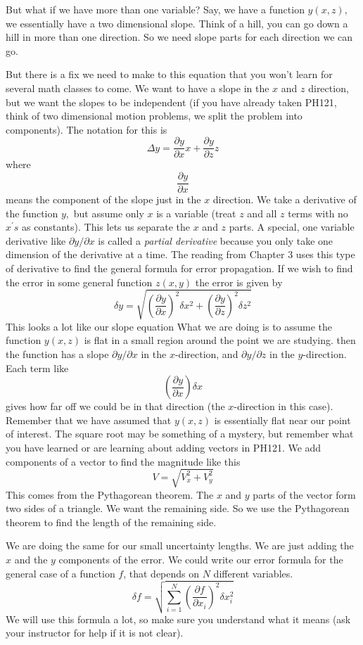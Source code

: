 \documentclass[twoside,11pt,ShortChapTitles]{BYUTextbook}
\begin{document}
But what if we have more than one variable? Say, we have a function $y(x,z),$
we essentially have a two dimensional slope. Think of a hill, you can go down
a hill in more than one direction. So we need slope parts for each direction
we can go.

But there is a fix we need to make to this equation that you won't learn for
several math classes to come. We want to have a slope in the $x$ and $z$
direction, but we want the slopes to be independent (if you have already taken
PH121, think of two dimensional motion problems, we split the problem into
components). The notation for this is
\[
\Delta y=\frac{\partial y}{\partial x}x+\frac{\partial y}{\partial z}z
\]
where
\[
\frac{\partial y}{\partial x}
\]
means the component of the slope just in the $x$ direction. We take a
derivative of the function $y,$ but assume only $x$ is a variable (treat $z$
and all $z$ terms with no $x^{\prime}s$ as constants). This lets us separate
the $x$ and $z$ parts. A special, one variable derivative like $\partial
y/\partial x$ is called a \emph{partial derivative} because you only take one
dimension of the derivative at a time. The reading from Chapter 3 uses this
type of derivative to find the general formula for error propagation. If we
wish to find the error in some general function $z\left(  x,y\right)  $ the
error is given by
\[
\delta y=\sqrt{\left(  \frac{\partial y}{\partial x}\right)  ^{2}\delta
x^{2}+\left(  \frac{\partial y}{\partial z}\right)  ^{2}\delta z^{2}}
\]
This looks a lot like our slope equation What we are doing is to assume the
function $y\left(  x,z\right)  $ is flat in a small region around the point we
are studying. then the function has a slope $\partial y/\partial x$ in the $x
$-direction, and $\partial y/\partial z$ in the $y$-direction. Each term like
\[
\left(  \frac{\partial y}{\partial x}\right)  \delta x
\]
gives how far off we could be in that direction (the $x$-direction in this
case). Remember that we have assumed that $y\left(  x,z\right)  $ is
essentially flat near our point of interest. The square root may be something
of a mystery, but remember what you have learned or are learning about adding
vectors in PH121. We add components of a vector to find the magnitude like
this
\[
V=\sqrt{V_{x}^{2}+V_{y}^{2}}
\]
This comes from the Pythagorean theorem. The $x$ and $y$ parts of the vector
form two sides of a triangle. We want the remaining side. So we use the
Pythagorean theorem to find the length of the remaining side.

We are doing the same for our small uncertainty lengths. We are just adding
the $x$ and the $y$ components of the error. We could write our error formula
for the general case of a function $f$, that depends on $N$ different
variables.
\[
\delta f=\sqrt{\sum_{i=1}^{N}\left(  \frac{\partial f}{\partial x_{i}}\right)
^{2}\delta x_{i}^{2}}
\]
We will use this formula a lot, so make sure you understand what it means (ask
your instructor for help if it is not clear).
\end{document}
